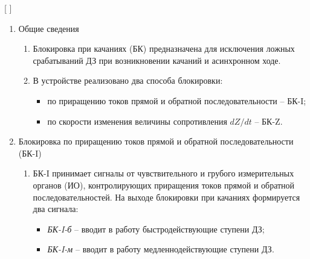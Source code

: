 
[
\def\fileExt{??}
]



\color{black}

\begin{enumerate}
\item Общие сведения

\begin{enumerate}

\item
Блокировка при качаниях (БК) предназначена для исключения ложных срабатываний ДЗ при возникновении качаний и асинхронном ходе.
\item 
В устройстве реализовано два способа блокировки:
\begin{itemize}
	\item по приращению токов прямой и обратной последовательности -- БК-I;
	\item по скорости изменения величины сопротивления $dZ/dt$ -- БК-Z.
\end{itemize}

\end{enumerate}

\item\label{sec:bki} Блокировка по приращению токов прямой и обратной последовательности (БК-I)
\begin{enumerate}

\item 
БК-I принимает сигналы от чувствительного и грубого измерительных органов (ИО), контролирующих приращения токов прямой и обратной последовательностей. На выходе блокировки при качаниях формируется два сигнала:

\begin{itemize}
	\item \textit{БК-I-б} -- вводит в работу быстродействующие ступени ДЗ;
	\item \textit{БК-I-м} -- вводит в работу медленнодействующие ступени ДЗ.
\end{itemize}


\end{enumerate}
\end{enumerate}
